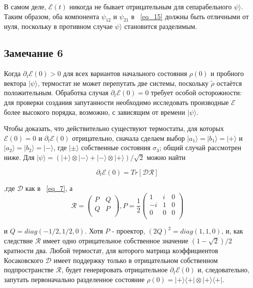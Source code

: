 \documentclass[11pt]{article}
\begin{document}
В самом деле, $\mathscr{E}(t)$ никогда не бывает отрицательным для сепарабельного $\psi \rangle$. Таким образом, оба компонента $\psi_{12}$ и $\psi_{21}$ в ~\ref{eq_15} должны быть отличными от нуля, поскольку в противном случае $\psi \rangle$ становится разделимым.

\subsection{Замечание 6}
Когда $\partial_t \mathscr{E}(0) > 0$ для всех вариантов начального состояния $\rho(0)$ и пробного вектора $| \psi \rangle$, термостат не может перепутать две системы, поскольку $\tilde{\rho}$ остаётся положительным. Обработка случая $\partial_t \mathscr{E}(0) = 0$ требует особой осторожности: для проверки создания запутанности необходимо исследовать производные $\mathscr{E}$ более высокого порядка, возможно, с зависящим от времени $| \psi \rangle$.

Чтобы доказать, что действительно существуют термостаты, для которых $\mathscr{E}(0)=0$ и $\partial_t \mathscr{E}(0)$ отрицательно, сначала сделаем выбор $|a_1\rangle = |b_1\rangle = |+\rangle$ и $|a_2\rangle = |b_2\rangle = |-\rangle$, где $| \pm \rangle$ собственные состояния $\sigma_3$; общий случай рассмотрен ниже.  Для $|\psi \rangle = (|+\rangle \otimes |-\rangle + |-\rangle \otimes |+\rangle ) / \sqrt{2}$
можно найти

\begin{equation}
\partial_t \mathscr{E}(0) = Tr[\mathscr{D}\mathscr{R}]
\label{eq_16}
\end{equation}

,где $\mathscr{D}$ как в ~\ref{eq_7}, а
\begin{equation}
\mathscr{R} = \left(
\begin{array}{cc}
P & Q \\
Q & P \\
\end{array}
\right),
P = \frac{1}{2}\left(
\begin{array}{ccc}
1 & i & 0 \\
-i & 1 & 0 \\
0 & 0 & 0 \\
\end{array}
\right)
\label{eq_17}
\end{equation}

и $Q=diag(-1/2, 1/2, 0)$.  
Хотя $P$ - проектор, $(2Q)^2=diag(1,1,0)$, и, как следствие $\mathscr{R}$ имеет одно отрицательное собственное значение $(1-\sqrt{2})/2$ кратности два. Любой термостат, для которого матрица коэффициентов Косаковского $\mathscr{D}$ имеет поддержку только в отрицательном собственном подпространстве $\mathscr{R}$, будет генерировать отрицательное $\partial_t \mathscr{E}(0)$ и, следовательно, запутать первоначально разделенное состояние $\rho(0)=|+\rangle \langle+| \otimes |+\rangle \langle+|$.
\end{document}
